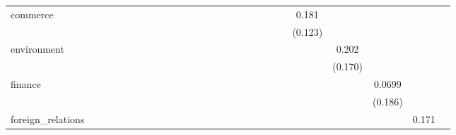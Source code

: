 \begin{tabular}{l*{25}{c}}
commerce            &            &            &            &            &            &            &            &            &            &            &            &            &            &            &            &            &            &            &            &            &       0.181&            &            &            &            \\
                    &            &            &            &            &            &            &            &            &            &            &            &            &            &            &            &            &            &            &            &            &     (0.123)&            &            &            &            \\
environment         &            &            &            &            &            &            &            &            &            &            &            &            &            &            &            &            &            &            &            &            &            &       0.202&            &            &            \\
                    &            &            &            &            &            &            &            &            &            &            &            &            &            &            &            &            &            &            &            &            &            &     (0.170)&            &            &            \\
finance             &            &            &            &            &            &            &            &            &            &            &            &            &            &            &            &            &            &            &            &            &            &            &      0.0699&            &            \\
                    &            &            &            &            &            &            &            &            &            &            &            &            &            &            &            &            &            &            &            &            &            &            &     (0.186)&            &            \\
foreign\_relations   &            &            &            &            &            &            &            &            &            &            &            &            &            &            &            &            &            &            &            &            &            &            &            &       0.171&            \\

\end{tabular}
